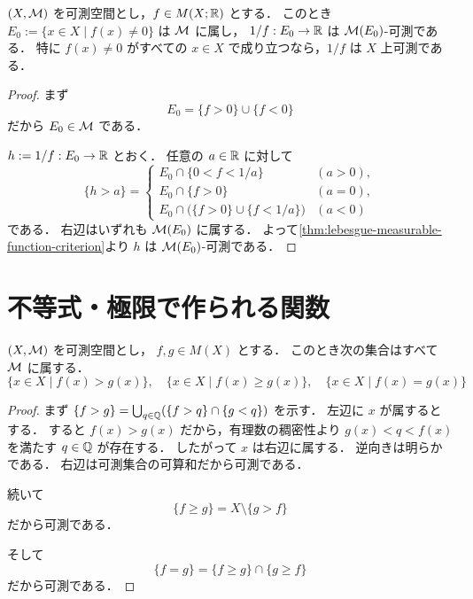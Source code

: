 \begin{proposition}[逆数]\label{prop:measurable-reciprocal}
$(X,\mathcal M)$ を可測空間とし，$f\in M(X;\mathbb R)$ とする．
このとき $E_0:=\{x\in X\mid f(x)\ne 0\}$ は $\mathcal M$ に属し，
$1/f:E_0\to\mathbb R$ は $\mathcal M(E_0)$-可測である．
特に $f(x)\ne 0$ がすべての $x\in X$ で成り立つなら，$1/f$ は $X$ 上可測である．
\end{proposition}
\begin{proof}
まず
\[
E_0=\{f>0\}\cup\{f<0\}
\]
だから $E_0\in\mathcal M$ である．

$h:=1/f:E_0\to\mathbb R$ とおく．
任意の $a\in\mathbb R$ に対して
\[
\{h>a\}
=
\begin{cases}
E_0\cap\{0<f<1/a\} & (a>0),\\
E_0\cap\{f>0\} & (a=0),\\
E_0\cap\bigl(\{f>0\}\cup\{f<1/a\}\bigr) & (a<0)
\end{cases}
\]
である．
右辺はいずれも $\mathcal M(E_0)$ に属する．
よって\cref{thm:lebesgue-measurable-function-criterion}より $h$ は $\mathcal M(E_0)$-可測である．
\end{proof}

\section{不等式・極限で作られる関数}

\begin{proposition}[比較からできる集合]\label{prop:measurable-comparison-sets}
$(X,\mathcal M)$ を可測空間とし，
$f,g\in M(X)$ とする．
このとき次の集合はすべて $\mathcal M$ に属する．
    \[
    \{x\in X \mid f(x)>g(x)\},\quad
    \{x\in X \mid f(x)\ge g(x)\},\quad
    \{x\in X \mid f(x)=g(x)\}
    \]
\end{proposition}
\begin{proof}
まず $\{f>g\}=\bigcup_{q\in\mathbb Q}(\{f>q\}\cap\{g<q\})$ を示す．
左辺に $x$ が属するとする．
すると $f(x)>g(x)$ だから，有理数の稠密性より
$g(x)<q<f(x)$ を満たす $q\in\mathbb Q$ が存在する．
したがって $x$ は右辺に属する．
逆向きは明らかである．
右辺は可測集合の可算和だから可測である．

続いて
\[
\{f\ge g\}=X\setminus\{g>f\}
\]
だから可測である．

そして
\[
\{f=g\}=\{f\ge g\}\cap\{g\ge f\}
\]
だから可測である．
\end{proof}

